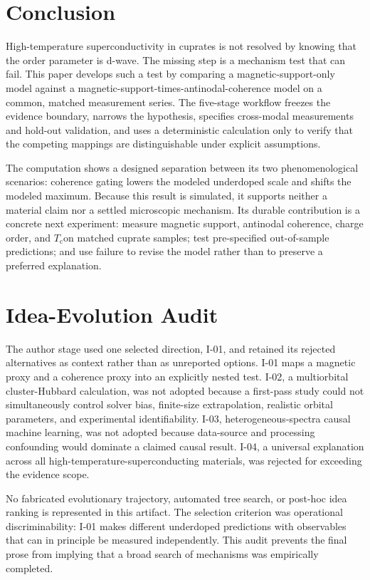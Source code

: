 \documentclass[conference]{IEEEtran}
\newcommand{\Tc}{\ensuremath{T_{\mathrm{c}}}}
\begin{document}
\section{Conclusion}

High-temperature superconductivity in cuprates is not resolved by knowing that the order parameter is d-wave. The missing step is a mechanism test that can fail. This paper develops such a test by comparing a magnetic-support-only model against a magnetic-support-times-antinodal-coherence model on a common, matched measurement series. The five-stage workflow freezes the evidence boundary, narrows the hypothesis, specifies cross-modal measurements and hold-out validation, and uses a deterministic calculation only to verify that the competing mappings are distinguishable under explicit assumptions.

The computation shows a designed separation between its two phenomenological scenarios: coherence gating lowers the modeled underdoped scale and shifts the modeled maximum. Because this result is simulated, it supports neither a material claim nor a settled microscopic mechanism. Its durable contribution is a concrete next experiment: measure magnetic support, antinodal coherence, charge order, and \Tc on matched cuprate samples; test pre-specified out-of-sample predictions; and use failure to revise the model rather than to preserve a preferred explanation.

\appendices
\section{Idea-Evolution Audit}

The author stage used one selected direction, I-01, and retained its rejected alternatives as context rather than as unreported options. I-01 maps a magnetic proxy and a coherence proxy into an explicitly nested test. I-02, a multiorbital cluster-Hubbard calculation, was not adopted because a first-pass study could not simultaneously control solver bias, finite-size extrapolation, realistic orbital parameters, and experimental identifiability. I-03, heterogeneous-spectra causal machine learning, was not adopted because data-source and processing confounding would dominate a claimed causal result. I-04, a universal explanation across all high-temperature-superconducting materials, was rejected for exceeding the evidence scope.

No fabricated evolutionary trajectory, automated tree search, or post-hoc idea ranking is represented in this artifact. The selection criterion was operational discriminability: I-01 makes different underdoped predictions with observables that can in principle be measured independently. This audit prevents the final prose from implying that a broad search of mechanisms was empirically completed.
\end{document}
